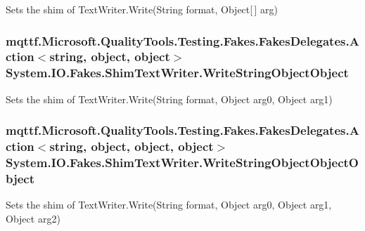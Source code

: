 Sets the shim of Text\-Writer.\-Write(\-String format, Object\mbox{[}$\,$\mbox{]} arg)

\hypertarget{class_system_1_1_i_o_1_1_fakes_1_1_shim_text_writer_a6c51199dd05b4928133325d992a4c93c}{
\subsubsection[{Write\-String\-Object\-Object}]{\setlength{\rightskip}{0pt plus 5cm}mqttf.\-Microsoft.\-Quality\-Tools.\-Testing.\-Fakes.\-Fakes\-Delegates.\-Action$<$string, object, object$>$ System.\-I\-O.\-Fakes.\-Shim\-Text\-Writer.\-Write\-String\-Object\-Object\hspace{0.3cm}{\ttfamily [set]}}}\label{class_system_1_1_i_o_1_1_fakes_1_1_shim_text_writer_a6c51199dd05b4928133325d992a4c93c}


Sets the shim of Text\-Writer.\-Write(\-String format, Object arg0, Object arg1)

\hypertarget{class_system_1_1_i_o_1_1_fakes_1_1_shim_text_writer_a964c9183704aa44aa37c75f0140e3214}{
\subsubsection[{Write\-String\-Object\-Object\-Object}]{\setlength{\rightskip}{0pt plus 5cm}mqttf.\-Microsoft.\-Quality\-Tools.\-Testing.\-Fakes.\-Fakes\-Delegates.\-Action$<$string, object, object, object$>$ System.\-I\-O.\-Fakes.\-Shim\-Text\-Writer.\-Write\-String\-Object\-Object\-Object\hspace{0.3cm}{\ttfamily [set]}}}\label{class_system_1_1_i_o_1_1_fakes_1_1_shim_text_writer_a964c9183704aa44aa37c75f0140e3214}


Sets the shim of Text\-Writer.\-Write(\-String format, Object arg0, Object arg1, Object arg2)

